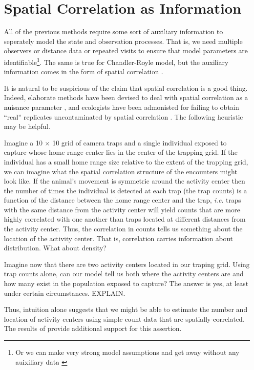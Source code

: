 \section{Spatial Correlation as Information}
\label{sect.corr-info}

All of the previous methods require some sort of auxiliary information
to seperately model the state and observation processes. That is, we
need multiple observers or distance data or repeated visits to ensure
that model parameters are identifiable\footnote{Or we can make very
  strong model assumptions and get away without any auixiliary data
  \citep{lele_etal:2012}}. The same is true for Chandler-Royle model,
but the auxiliary information comes in the form of spatial correlation
\citep{chandler_royle:2012}.

It is natural to be suspicious of the claim that spatial correlation
is a good thing. Indeed, elaborate methods have been devised to deal
with spatial correlation as a nuisance parameter
\citep{dormann_etal:2007}, and ecologists have been admonisted for
failing to obtain ``real'' replicates uncontaminated by spatial
correlation \citep{hurlbert:1984}. The following heuristic may be
helpful.

Imagine a 10 $\times$ 10 grid of camera traps and a single individual
exposed to capture whose home range center lies in the center of the
trapping grid. If the individual has a small home range size relative
to the extent of the trapping grid, we can imagine what the
spatial correlation structure of the encounters might look
like. If the animal's movement is symmetric around the activity center
then the number of times the individual is detected at each
trap (the trap counts) is a function of the distance between the home
range center and the trap, \emph{i.e.} traps with the same distance from the
activity center will yield counts that are more highly correlated with
one another than traps located at different distances from the
activity center. Thus, the correlation in counts tells us something
about the location of the activity center. That is, correlation
carries information about distribution. What about density?

Imagine now that there are two activity centers located in our traping
grid. Using trap counts alone, can our model tell us both where the
activity centers are and how many exist in the population exposed to
capture? The answer is yes, at least under certain circumstances.
EXPLAIN.

Thus, intuition alone suggests that we might be able to estimate the
number and location of activity centers using simple count data that
are spatially-correlated. The results of
\citet{chandler_royle:2012} provide additional support for this
assertion.


